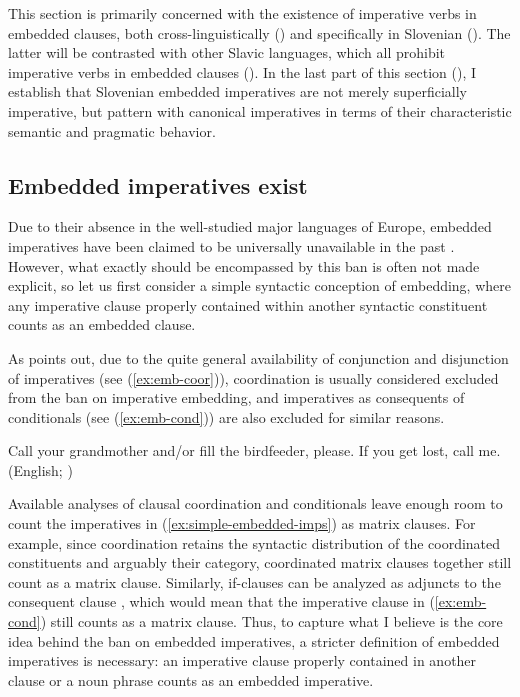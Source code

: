 \documentclass[output=paper,colorlinks,citecolor=brown]{langscibook}
\begin{document}
This section is primarily concerned with the existence of imperative verbs in embedded clauses, both cross-linguistically () and specifically in Slovenian (). The latter will be contrasted with other Slavic languages, which all prohibit imperative verbs in embedded clauses (). In the last part of this section (), I establish that Slovenian embedded imperatives are not merely superficially imperative, but pattern with canonical imperatives in terms of their characteristic semantic and pragmatic behavior.

\subsection{Embedded imperatives exist}
\label{subsec:emb-imp}


Due to their absence in the well-studied major languages of Europe, embedded imperatives have been claimed to be universally unavailable in the past \citep[see e.g.][]{Sadock.Zwicky1985,han98,han00}. However, what exactly should be encompassed by this ban is often not made explicit, so let us first consider a simple syntactic conception of embedding, where any imperative clause properly contained within another syntactic constituent counts as an embedded clause. 

As \citet{kaufmann21} points out, due to the quite general availability of conjunction and disjunction of imperatives (see (\ref{ex:emb-coor})), coordination is usually considered excluded from the ban on imperative embedding, and imperatives as consequents of conditionals (see (\ref{ex:emb-cond})) are also excluded for similar reasons.   

\ea\label{ex:simple-embedded-imps}
\ea \label{ex:emb-coor} Call your grandmother and/or fill the birdfeeder, please.
\ex \label{ex:emb-cond} If you get lost, call me.\hfill (English; \citealt{kaufmann21})
\z\z

\noindent Available analyses of clausal coordination and conditionals leave enough room to count the imperatives in (\ref{ex:simple-embedded-imps}) as matrix clauses. For example, since coordination retains the syntactic distribution of the coordinated constituents and arguably their category, coordinated matrix clauses together still count as a matrix clause. Similarly, if-clauses can be analyzed as adjuncts to the consequent clause \citep[see][646--647]{bhattpancheva06}, which would mean that the imperative clause in (\ref{ex:emb-cond}) still counts as a matrix clause. Thus, to capture what I believe is the core idea behind the ban on embedded imperatives, a stricter definition of embedded imperatives is necessary: an imperative clause properly contained in another clause or a noun phrase counts as an embedded imperative.  
\end{document}
